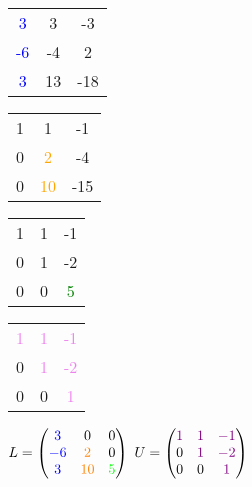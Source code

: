 			\begin{minipage}{0.25\linewidth}
			\begin{tabular}{|c c c|}
			\hline
			\textcolor{blue}3 & 3 & -3 \\
			\textcolor{blue}{-6} & -4 & 2 \\
			\textcolor{blue}3 & 13 & -18 \\
			\hline
			\end{tabular}
			\end{minipage}	
			\hfill
			\begin{minipage}{0.25\linewidth}
			\begin{tabular}{|c c c|}
			\hline
			1 & 1 & -1 \\
			0 & \textcolor{orange}2 & -4 \\
			0 & \textcolor{orange}{10} & -15 \\
			\hline
			\end{tabular}
			\end{minipage}		
			\hfill
			\begin{minipage}{0.25\linewidth}
			\begin{tabular}{|c c c|}
			\hline
			1 & 1 & -1 \\
			0 & 1 & -2 \\
			0 & 0 & \textcolor{green}5 \\
			\hline
			\end{tabular}
			\end{minipage}	
			
			\vspace{0.3cm}
			
			\begin{minipage}{0.25\linewidth}
			\begin{tabular}{|c c c|}
			\hline
			\textcolor{violet}1 & \textcolor{violet}1 & \textcolor{violet}{-1} \\
			0 & \textcolor{violet}1 & \textcolor{violet}{-2} \\
			0 & 0 & \textcolor{violet}1 \\
			\hline
			\end{tabular}
			\end{minipage}	
			\hfill
			\begin{minipage}{0.65\linewidth}
			$L = \begin{pmatrix} \textcolor{blue}3 & 0 & 0 \\ \textcolor{blue}{-6} & \textcolor{orange}2 & 0 \\ \textcolor{blue}3 & \textcolor{orange}{10} & \textcolor{green}5   \end{pmatrix}$ \quad $U = \begin{pmatrix} \textcolor{violet}1 & \textcolor{violet}1 & \textcolor{violet}{-1} \\ 0 & \textcolor{violet}1 & \textcolor{violet}{-2} \\ 0 & 0 & \textcolor{violet}1  
			 \end{pmatrix}$
			\end{minipage}				    
		    
